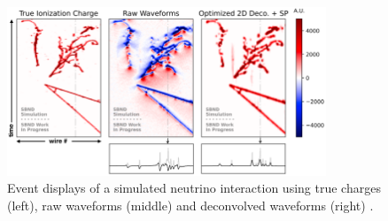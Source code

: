 %

\begin{figure}[b!]
\centering    
\includegraphics[width=0.85\textwidth]{signal_processing_waveform}
\caption[Event Displays of a Neutrino Interaction Before and After Signal Processing]{
Event displays of a simulated neutrino interaction using true charges (left), raw waveforms (middle) and deconvolved waveforms (right) \cite{LynnSignal}.
}
\label{fig:signal_processing_waveform}
\end{figure}


